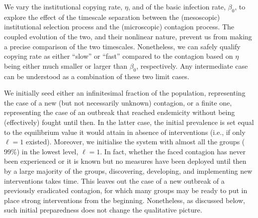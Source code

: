We vary the institutional copying rate, $\eta$, and of the basic infection rate, $\beta_0$, to explore the effect of the timescale separation between the (mesoscopic) institutional selection process and the (microscopic) contagion process. The coupled evolution of the two, and their nonlinear nature, prevent us from making a precise comparison of the two timescales. Nonetheless, we can safely qualify copying rate as either ``slow'' or ``fast'' compared to the contagion based on $\eta$ being either much smaller or larger than $\beta_0$, respectively. Any intermediate case can be understood as a combination of these two limit cases.

We initially seed either an infinitesimal fraction of the population, representing the case of a new (but not necessarily unknown) contagion, or a finite one, representing the case of an outbreak that reached endemicity without being (effectively) fought until then. In the latter case, the initial prevalence is set equal to the equilibrium value it would attain in absence of interventions (i.e., if only $\ell = 1$ existed). Moreover, we initialise the system with almost all the groups ($99\%$) in the lowest level, $\ell = 1$. In fact, whether the faced contagion has never been experienced or it is known but no measures have been deployed until then by a large majority of the groups, discovering, developing, and implementing new interventions takes time. This leaves out the case of a new outbreak of a previously eradicated contagion, for which many groups may be ready to put in place strong interventions from the beginning. Nonetheless, as discussed below, such initial preparedness does not change the qualitative picture.

